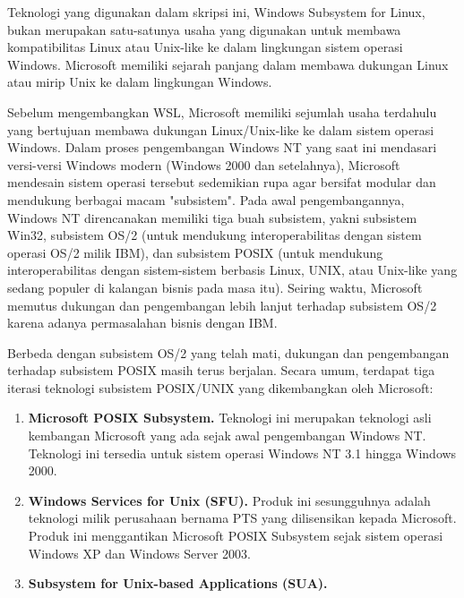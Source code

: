 Teknologi yang digunakan dalam skripsi ini, Windows Subsystem for Linux, bukan merupakan satu-satunya usaha yang digunakan untuk membawa kompatibilitas Linux atau Unix-like ke dalam lingkungan sistem operasi Windows. Microsoft memiliki sejarah panjang dalam membawa dukungan Linux atau mirip Unix ke dalam lingkungan Windows.

Sebelum mengembangkan WSL, Microsoft memiliki sejumlah usaha terdahulu yang bertujuan membawa dukungan Linux/Unix-like ke dalam sistem operasi Windows. Dalam proses pengembangan Windows NT yang saat ini mendasari versi-versi Windows modern (Windows 2000 dan setelahnya), Microsoft mendesain sistem operasi tersebut sedemikian rupa agar bersifat modular dan mendukung berbagai macam "subsistem". Pada awal pengembangannya, Windows NT direncanakan memiliki tiga buah subsistem, yakni subsistem Win32, subsistem OS/2 (untuk mendukung interoperabilitas dengan sistem operasi OS/2 milik IBM), dan subsistem POSIX (untuk mendukung interoperabilitas dengan sistem-sistem berbasis Linux, UNIX, atau Unix-like yang sedang populer di kalangan bisnis pada masa itu). Seiring waktu, Microsoft memutus dukungan dan pengembangan lebih lanjut terhadap subsistem OS/2 karena adanya permasalahan bisnis dengan IBM.

Berbeda dengan subsistem OS/2 yang telah mati, dukungan dan pengembangan terhadap subsistem POSIX masih terus berjalan. Secara umum, terdapat tiga iterasi teknologi subsistem POSIX/UNIX yang dikembangkan oleh Microsoft:

\begin{enumerate}
    \item \textbf{Microsoft POSIX Subsystem.} Teknologi ini merupakan teknologi asli kembangan Microsoft yang ada sejak awal pengembangan Windows NT. Teknologi ini tersedia untuk sistem operasi Windows NT 3.1 hingga Windows 2000.
    \item \textbf{Windows Services for Unix (SFU).} Produk ini sesungguhnya adalah teknologi milik perusahaan bernama PTS yang dilisensikan kepada Microsoft. Produk ini menggantikan Microsoft POSIX Subsystem sejak sistem operasi Windows XP dan Windows Server 2003.
    \item \textbf{Subsystem for Unix-based Applications (SUA).}
\end{enumerate}

